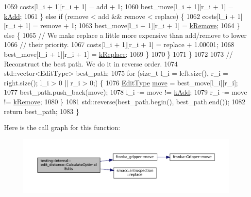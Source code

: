 \begin{DoxyCode}
1059         costs[l\_i + 1][r\_i + 1] = add + 1;
1060         best\_move[l\_i + 1][r\_i + 1] = \hyperlink{namespacetesting_1_1internal_1_1edit__distance_ad46aa6da12aec1a3f166310478b53a08a63400b073f5b311a87d568b5ae27ffe8}{kAdd};
1061       \} \textcolor{keywordflow}{else} \textcolor{keywordflow}{if} (\textcolor{keyword}{remove} < add && \textcolor{keyword}{remove} < replace) \{
1062         costs[l\_i + 1][r\_i + 1] = \textcolor{keyword}{remove} + 1;
1063         best\_move[l\_i + 1][r\_i + 1] = \hyperlink{namespacetesting_1_1internal_1_1edit__distance_ad46aa6da12aec1a3f166310478b53a08a814768ef6cd0264a0a10b1e701a63e78}{kRemove};
1064       \} \textcolor{keywordflow}{else} \{
1065         \textcolor{comment}{// We make replace a little more expensive than add/remove to lower}
1066         \textcolor{comment}{// their priority.}
1067         costs[l\_i + 1][r\_i + 1] = replace + 1.00001;
1068         best\_move[l\_i + 1][r\_i + 1] = \hyperlink{namespacetesting_1_1internal_1_1edit__distance_ad46aa6da12aec1a3f166310478b53a08afdbf30ecf9f32f60c646a34a358615f2}{kReplace};
1069       \}
1070     \}
1071   \}
1072 
1073   \textcolor{comment}{// Reconstruct the best path. We do it in reverse order.}
1074   std::vector<EditType> best\_path;
1075   \textcolor{keywordflow}{for} (\textcolor{keywordtype}{size\_t} l\_i = left.size(), r\_i = right.size(); l\_i > 0 || r\_i > 0;) \{
1076     \hyperlink{namespacetesting_1_1internal_1_1edit__distance_ad46aa6da12aec1a3f166310478b53a08}{EditType} \hyperlink{namespacefranka__gripper_a1356a87108d2229401d3755bd3e53bdf}{move} = best\_move[l\_i][r\_i];
1077     best\_path.push\_back(move);
1078     l\_i -= move != \hyperlink{namespacetesting_1_1internal_1_1edit__distance_ad46aa6da12aec1a3f166310478b53a08a63400b073f5b311a87d568b5ae27ffe8}{kAdd};
1079     r\_i -= move != \hyperlink{namespacetesting_1_1internal_1_1edit__distance_ad46aa6da12aec1a3f166310478b53a08a814768ef6cd0264a0a10b1e701a63e78}{kRemove};
1080   \}
1081   std::reverse(best\_path.begin(), best\_path.end());
1082   \textcolor{keywordflow}{return} best\_path;
1083 \}
\end{DoxyCode}
Here is the call graph for this function\+:
\nopagebreak
\begin{figure}[H]
\begin{center}
\leavevmode
\includegraphics[width=350pt]{namespacetesting_1_1internal_1_1edit__distance_a26323b4c2a29ea8e187aafbd4d2275db_cgraph}
\end{center}
\end{figure}
